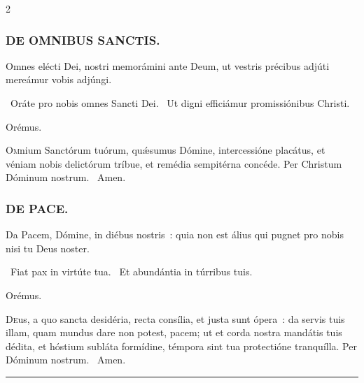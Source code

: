 \documentclass[9pt,twoside]{extarticle}
\begin{document}
\begin{multicols}{2}
{\subsubsection*{\center \textsc{DE OMNIBUS SANCTIS.}}
\begin{tightlist}{}
\item {} Omnes elécti Dei, nostri memorámini ante Deum, ut vestris précibus adjúti mereámur vobis adjúngi.
\item {}~Oráte pro nobis omnes Sancti Dei. ~Ut digni efficiámur promissiónibus Christi.
\item Orémus. \hfill {}
\end{tightlist}
\lettrine{O}mnium Sanctórum tuórum, quǽsumus Dómine, intercessióne placátus, et véniam nobis delictórum tríbue, et remédia sempitérna concéde. Per Christum Dóminum nostrum. ~Amen.

\subsubsection*{\center \textsc{DE PACE.}}
\begin{tightlist}{}
\item {} Da Pacem, Dómine, in diébus nostris~: quia non est álius qui pugnet pro nobis nisi tu Deus noster.
\item {}~Fiat pax in virtúte tua. ~Et abundántia in túrribus tuis.
\item Orémus. \hfill {}
\end{tightlist}
\lettrine{D}eus, a quo sancta desidéria, recta consília, et justa sunt ópera~: da servis tuis illam, quam mundus dare non potest, pacem; ut et corda nostra mandátis tuis dédita, et hóstium subláta formídine, témpora sint tua protectióne tranquílla. Per Dóminum nostrum. ~Amen.

\begin{center}\textcolor{red}{\rule{\linewidth}{0.5pt}} \end{center}

}
\end{multicols}
\end{document}

